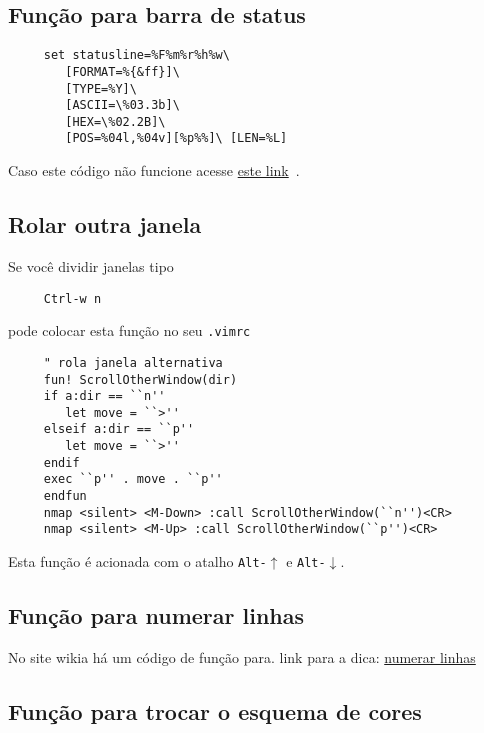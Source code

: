 \subsection{Função para barra de status}\label{Função para barra de status}

\begin{verbatim}
     set statusline=%F%m%r%h%w\
        [FORMAT=%{&ff}]\
        [TYPE=%Y]\
        [ASCII=\%03.3b]\
        [HEX=\%02.2B]\
        [POS=%04l,%04v][%p%%]\ [LEN=%L]
\end{verbatim}

Caso este código não funcione acesse
\href{http://vim.wikia.com/wiki/Writing\_a\_valid\_statusline}{este
link}~\cite{StatusLine}.


\subsection{Rolar outra janela}\label{Rolar outra janela}

Se você dividir janelas tipo

\begin{verbatim}
     Ctrl-w n
\end{verbatim}

pode colocar esta função no seu \verb|.vimrc|

\begin{verbatim}
     " rola janela alternativa
     fun! ScrollOtherWindow(dir)
     if a:dir == ``n''
        let move = ``>''
     elseif a:dir == ``p''
        let move = ``>''
     endif
     exec ``p'' . move . ``p''
     endfun
     nmap <silent> <M-Down> :call ScrollOtherWindow(``n'')<CR>
     nmap <silent> <M-Up> :call ScrollOtherWindow(``p'')<CR>
\end{verbatim}

Esta função é acionada com o atalho {\tt Alt-$\uparrow$} e {\tt Alt-$\downarrow$}.

\subsection{Função para numerar linhas}\label{Função para numerar linhas}

No site wikia há um código de função para.  link para a dica:
\href{http://vim.wikia.com/wiki/Number\_a\_group\_of\_lines}{numerar linhas}~\cite{NumerarLinhas}

\subsection{Função para trocar o esquema de cores}

